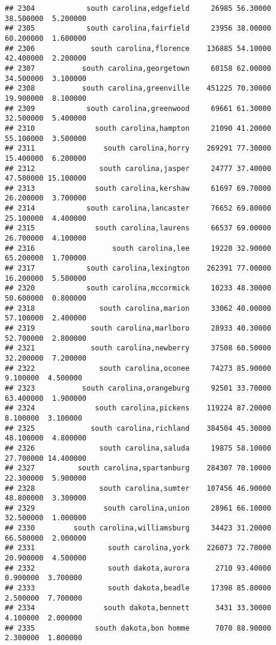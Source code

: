 \documentclass[
]{article}
\begin{document}
\begin{verbatim}
## 2304            south carolina,edgefield     26985 56.30000 38.500000  5.200000
## 2305            south carolina,fairfield     23956 38.00000 60.200000  1.600000
## 2306             south carolina,florence    136885 54.10000 42.400000  2.200000
## 2307           south carolina,georgetown     60158 62.00000 34.500000  3.100000
## 2308           south carolina,greenville    451225 70.30000 19.900000  8.100000
## 2309            south carolina,greenwood     69661 61.30000 32.500000  5.400000
## 2310              south carolina,hampton     21090 41.20000 55.100000  3.500000
## 2311                south carolina,horry    269291 77.30000 15.400000  6.200000
## 2312               south carolina,jasper     24777 37.40000 47.500000 15.100000
## 2313              south carolina,kershaw     61697 69.70000 26.200000  3.700000
## 2314            south carolina,lancaster     76652 69.80000 25.100000  4.400000
## 2315              south carolina,laurens     66537 69.00000 26.700000  4.100000
## 2316                  south carolina,lee     19220 32.90000 65.200000  1.700000
## 2317            south carolina,lexington    262391 77.00000 16.200000  5.500000
## 2320            south carolina,mccormick     10233 48.30000 50.600000  0.800000
## 2318               south carolina,marion     33062 40.00000 57.100000  2.400000
## 2319             south carolina,marlboro     28933 40.30000 52.700000  2.800000
## 2321             south carolina,newberry     37508 60.50000 32.200000  7.200000
## 2322               south carolina,oconee     74273 85.90000  9.100000  4.500000
## 2323           south carolina,orangeburg     92501 33.70000 63.400000  1.900000
## 2324              south carolina,pickens    119224 87.20000  8.100000  3.100000
## 2325             south carolina,richland    384504 45.30000 48.100000  4.800000
## 2326               south carolina,saluda     19875 58.10000 27.700000 14.400000
## 2327          south carolina,spartanburg    284307 70.10000 22.300000  5.900000
## 2328               south carolina,sumter    107456 46.90000 48.800000  3.300000
## 2329                south carolina,union     28961 66.10000 32.500000  1.000000
## 2330         south carolina,williamsburg     34423 31.20000 66.500000  2.000000
## 2331                 south carolina,york    226073 72.70000 20.900000  4.500000
## 2332                 south dakota,aurora      2710 93.40000  0.900000  3.700000
## 2333                 south dakota,beadle     17398 85.80000  2.500000  7.700000
## 2334                south dakota,bennett      3431 33.30000  4.100000  2.000000
## 2335              south dakota,bon homme      7070 88.90000  2.300000  1.800000

\end{verbatim}
\end{document}
